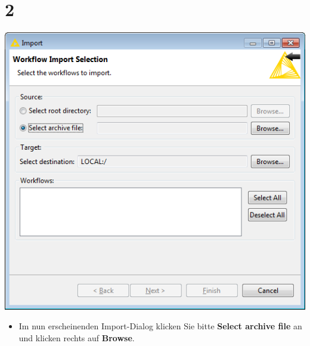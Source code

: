 \documentclass{beamer}
\begin{document}
\section{2}
\begin{frame}
	\begin{center}
  		\includegraphics[height=0.6\textheight]{2.png}
	\end{center}
	\begin{itemize}
		\item Im nun erscheinenden Import-Dialog klicken Sie bitte \textbf{Select archive file} an und klicken rechts auf \textbf{Browse}.
	\end{itemize}
\end{frame}
\end{document}
